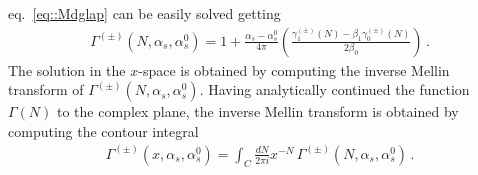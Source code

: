 eq.~\eqref{eq::Mdglap} can be easily solved getting
\begin{align}
    \Gamma^{(\pm)}\left(N,\alpha_s,\alpha_s^0\right) = 
    1 + \frac{\alpha_s -\alpha_s^0}{4\pi}
    \left(\frac{\gamma^{(\pm)}_1 \left(N\right)-\beta_1 \gamma^{(\pm)}_0\left(N\right)}{2\beta_0} \right)
    \,.
\end{align}
%
The solution in the $x$-space is obtained by computing the inverse Mellin
transform of $\Gamma^{(\pm)}\left(N,\alpha_s,\alpha_s^0\right)$. Having
analytically continued the function $\Gamma\left(N\right)$ to the complex plane,
the inverse Mellin transform is obtained by computing the contour integral
\begin{align}
    \Gamma^{(\pm)}\left(x,\alpha_s,\alpha_s^0\right) = 
    \int_C \frac{dN}{2\pi i}x^{-N}\, 
    \Gamma^{(\pm)}\left(N,\alpha_s,\alpha_s^0\right)\, .
\end{align}


